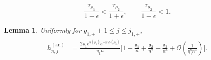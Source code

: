 \documentclass[10pt,a4paper]{amsart}
\newtheorem{lemma}{Lemma}
\begin{document}
\begin{equation}
\label{def of tau k ast epsilon inequality}
    \frac{\tau_{\rho_1}}{1-\epsilon}<\frac{\tau_{\rho_2}}{1+\epsilon},\qquad \frac{\tau_{\rho_2}}{1-\epsilon}<1. 
\end{equation}

\begin{lemma}\label{lemma: g1+leq j leq j+1}
Uniformly for $g_{1,+}+1\leq j\leq j_{1,+}$,
\begin{align}
\begin{split}
h_{n,j}^{(\mathrm{an})}
&=
\frac{2\rho_1e^{\mathsf{k}(\rho_1)}e^{-nV_{\tau}(\rho_1)}}{\eta_1 n}
\bigg[1-\frac{\mathfrak{a}_1}{n}+\frac{\mathfrak{a}_2}{n^2}-\frac{\mathfrak{a}_3}{n^3}+\mathcal{O}(\frac{1}{\eta_1^8n^4})\bigg].
\end{split}    
\end{align}
\end{lemma}
\end{document}
